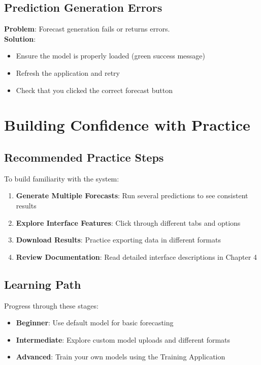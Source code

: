 \subsection{Prediction Generation Errors}

\textbf{Problem}: Forecast generation fails or returns errors.\\
\textbf{Solution}:
\begin{itemize}
	\item Ensure the model is properly loaded (green success message)
	\item Refresh the application and retry
	\item Check that you clicked the correct forecast button
\end{itemize}

\section{Building Confidence with Practice}

\subsection{Recommended Practice Steps}

To build familiarity with the system:

\begin{enumerate}
	\item \textbf{Generate Multiple Forecasts}: Run several predictions to see consistent results
	\item \textbf{Explore Interface Features}: Click through different tabs and options
	\item \textbf{Download Results}: Practice exporting data in different formats
	\item \textbf{Review Documentation}: Read detailed interface descriptions in Chapter 4
\end{enumerate}

\subsection{Learning Path}

Progress through these stages:

\begin{itemize}
	\item \textbf{Beginner}: Use default model for basic forecasting
	\item \textbf{Intermediate}: Explore custom model uploads and different formats
	\item \textbf{Advanced}: Train your own models using the Training Application
\end{itemize}

